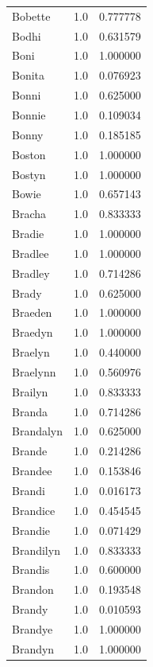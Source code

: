 \documentclass[
  letterpaper,
  DIV=11,
  numbers=noendperiod]{scrreprt}
\begin{document}
\begin{tabular}{lrr}
Bobette         &   1.0 &   0.777778 \\
Bodhi           &   1.0 &   0.631579 \\
Boni            &   1.0 &   1.000000 \\
Bonita          &   1.0 &   0.076923 \\
Bonni           &   1.0 &   0.625000 \\
Bonnie          &   1.0 &   0.109034 \\
Bonny           &   1.0 &   0.185185 \\
Boston          &   1.0 &   1.000000 \\
Bostyn          &   1.0 &   1.000000 \\
Bowie           &   1.0 &   0.657143 \\
Bracha          &   1.0 &   0.833333 \\
Bradie          &   1.0 &   1.000000 \\
Bradlee         &   1.0 &   1.000000 \\
Bradley         &   1.0 &   0.714286 \\
Brady           &   1.0 &   0.625000 \\
Braeden         &   1.0 &   1.000000 \\
Braedyn         &   1.0 &   1.000000 \\
Braelyn         &   1.0 &   0.440000 \\
Braelynn        &   1.0 &   0.560976 \\
Brailyn         &   1.0 &   0.833333 \\
Branda          &   1.0 &   0.714286 \\
Brandalyn       &   1.0 &   0.625000 \\
Brande          &   1.0 &   0.214286 \\
Brandee         &   1.0 &   0.153846 \\
Brandi          &   1.0 &   0.016173 \\
Brandice        &   1.0 &   0.454545 \\
Brandie         &   1.0 &   0.071429 \\
Brandilyn       &   1.0 &   0.833333 \\
Brandis         &   1.0 &   0.600000 \\
Brandon         &   1.0 &   0.193548 \\
Brandy          &   1.0 &   0.010593 \\
Brandye         &   1.0 &   1.000000 \\
Brandyn         &   1.0 &   1.000000 \\

\end{tabular}
\end{document}
